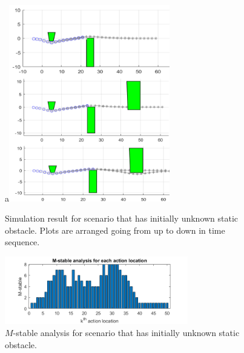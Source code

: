 \documentclass{ifacconf}
\begin{document}
\begin{figure}[htbp]
\begin{center}

\hspace{0.5cm}

\vspace{0.5cm}
\subfloat a{\includegraphics[width=7cm]{src/2_1_1.png}}
\caption{Simulation result for scenario that has initially unknown static obstacle. Plots are arranged going from up to down in time sequence.}
\label{fig: mpc}
\end{center}
\end{figure}

\begin{figure}[htbp]
\begin{center}
\includegraphics[width=8cm]{src/2_2_M-stable.png}
\caption{$M$-stable analysis for scenario that has initially unknown static obstacle. }
\label{fig: mpc}
\end{center}
\end{figure}
\end{document}

